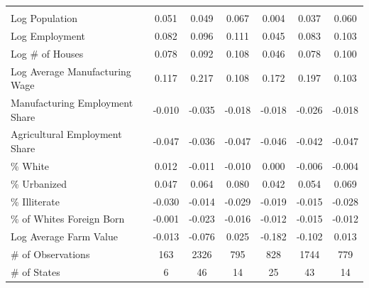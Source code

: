 \begin{table}[htbp]
\begin{tabular}{lcccccc}
\addlinespace
\multicolumn{7}{l}{\textit{Changes 1920--1930}} \\
Log Population & 0.051 & 0.049 & 0.067 & 0.004 & 0.037 & 0.060 \\
Log Employment & 0.082 & 0.096 & 0.111 & 0.045 & 0.083 & 0.103 \\
Log \# of Houses & 0.078 & 0.092 & 0.108 & 0.046 & 0.078 & 0.100 \\
Log Average Manufacturing Wage & 0.117 & 0.217 & 0.108 & 0.172 & 0.197 & 0.103 \\
Manufacturing Employment Share & -0.010 & -0.035 & -0.018 & -0.018 & -0.026 & -0.018 \\
Agricultural Employment Share & -0.047 & -0.036 & -0.047 & -0.046 & -0.042 & -0.047 \\
\% White & 0.012 & -0.011 & -0.010 & 0.000 & -0.006 & -0.004 \\
\% Urbanized & 0.047 & 0.064 & 0.080 & 0.042 & 0.054 & 0.069 \\
\% Illiterate & -0.030 & -0.014 & -0.029 & -0.019 & -0.015 & -0.028 \\
\% of Whites Foreign Born & -0.001 & -0.023 & -0.016 & -0.012 & -0.015 & -0.012 \\
Log Average Farm Value & -0.013 & -0.076 & 0.025 & -0.182 & -0.102 & 0.013 \\
\addlinespace
\# of Observations & 163 & 2326 & 795 & 828 & 1744 & 779 \\
\# of States & 6 & 46 & 14 & 25 & 43 & 14 \\
\bottomrule
\end{tabular}
\end{table}